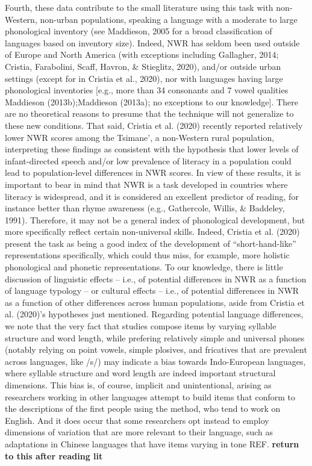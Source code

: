 \documentclass[english,,man,floatsintext]{apa6}
\begin{document}
Fourth, these data contribute to the small literature using this task with non-Western, non-urban populations, speaking a language with a moderate to large phonological inventory (see Maddieson, 2005 for a broad classification of languages based on inventory size). Indeed, NWR has seldom been used outside of Europe and North America (with exceptions including Gallagher, 2014; Cristia, Farabolini, Scaff, Havron, \& Stieglitz, 2020), and/or outside urban settings (except for in Cristia et al., 2020), nor with languages having large phonological inventories {[}e.g., more than 34 consonants and 7 vowel qualities Maddieson (2013b);Maddieson (2013a); no exceptions to our knowledge{]}. There are no theoretical reasons to presume that the technique will not generalize to these new conditions. That said, Cristia et al. (2020) recently reported relatively lower NWR scores among the Tsimane', a non-Western rural population, interpreting these findings as consistent with the hypothesis that lower levels of infant-directed speech and/or low prevalence of literacy in a population could lead to population-level differences in NWR scores. In view of these results, it is important to bear in mind that NWR is a task developed in countries where literacy is widespread, and it is considered an excellent predictor of reading, for instance better than rhyme awareness (e.g., Gathercole, Willis, \& Baddeley, 1991). Therefore, it may not be a general index of phonological development, but more specifically reflect certain non-universal skills. Indeed, Cristia et al. (2020) present the task as being a good index of the development of \enquote{short-hand-like} representations specifically, which could thus miss, for example, more holistic phonological and phonetic representations. To our knowledge, there is little discussion of linguistic effects -- i.e., of potential differences in NWR as a function of language typology -- or cultural effects -- i.e., of potential differences in NWR as a function of other differences across human populations, aside from Cristia et al. (2020)'s hypotheses just mentioned. Regarding potential language differences, we note that the very fact that studies compose items by varying syllable structure and word length, while prefering relatively simple and universal phones (notably relying on point vowels, simple plosives, and fricatives that are prevalent across languages, like /s/) may indicate a bias towards Indo-European languages, where syllable structure and word length are indeed important structural dimensions. This bias is, of course, implicit and unintentional, arising as researchers working in other languages attempt to build items that conform to the descriptions of the first people using the method, who tend to work on English. And it does occur that some researchers opt instead to employ dimensions of variation that are more relevant to their language, such as adaptations in Chinese languages that have items varying in tone REF. \textbf{return to this after reading lit}
\end{document}
